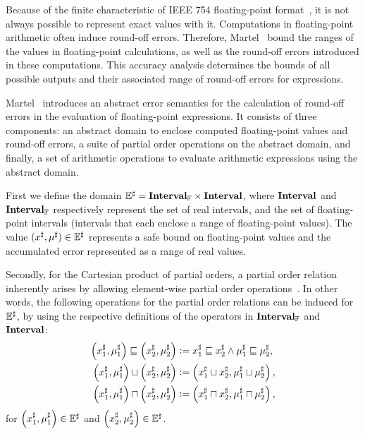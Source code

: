 Because of the finite characteristic of IEEE 754 floating-point
format~\cite{ieee754}, it is not always possible to represent exact values
with it.  Computations in floating-point arithmetic often induce round-off
errors.  Therefore, Martel~\cite{martel07} bound the ranges of the values
in floating-point calculations, as well as the round-off errors introduced
in these computations.  This accuracy analysis determines the bounds of
all possible outputs and their associated range of round-off errors for
expressions.

Martel~\cite{martel07} introduces an abstract error semantics for the
calculation of round-off errors in the evaluation of floating-point
expressions.  It consists of three components: an abstract domain to enclose
computed floating-point values and round-off errors, a suite of partial order
operations on the abstract domain, and finally, a set of arithmetic operations
to evaluate arithmetic expressions using the abstract domain.

First we define the domain $\mathbb{E}^\sharp = \mathbf{Interval}_\mathbb{F}\times\mathbf{Interval}$,
where $\mathbf{Interval}$ and $\mathbf{Interval}_\mathbb{F}$ respectively represent the
set of real intervals, and the set of floating-point intervals (intervals
that each enclose a range of floating-point values).  The value $(x^\sharp,
\mu^\sharp) \in \mathbb{E}^\sharp$ represents a safe bound on floating-point
values and the accumulated error represented as a range of real values.

Secondly, for the Cartesian product of partial orders, a partial order
relation inherently arises by allowing element-wise partial order
operations~\cite{abramsky94}.  In other words, the following operations for the
partial order relations can be induced for $\mathbb{E}^\sharp$, by using the respective
definitions of the operators in $\mathbf{Interval}_\mathbb{F}$ and $\mathbf{Interval}$:
\begin{equation}
    \begin{aligned}
        \left( x^\sharp_1, \mu^\sharp_1 \right) \sqsubseteq
        \left( x^\sharp_2, \mu^\sharp_2 \right)
        &\vcentcolon=
            x^\sharp_1 \sqsubseteq x^\sharp_2 \wedge
            \mu^\sharp_1 \sqsubseteq \mu^\sharp_2, \\
        \left( x^\sharp_1, \mu^\sharp_1 \right) \sqcup
        \left( x^\sharp_2, \mu^\sharp_2 \right)
        &\vcentcolon=
            \left( x^\sharp_1 \sqcup x^\sharp_2,
              \mu^\sharp_1 \sqcup \mu^\sharp_2 \right), \\
        \left( x^\sharp_1, \mu^\sharp_1 \right) \sqcap
        \left( x^\sharp_2, \mu^\sharp_2 \right)
        &\vcentcolon=
            \left( x^\sharp_1 \sqcap x^\sharp_2,
              \mu^\sharp_1 \sqcap \mu^\sharp_2 \right),
    \end{aligned}
\end{equation}
for $\left( x^\sharp_1, \mu^\sharp_1 \right) \in \mathbb{E}^\sharp$ and
$\left( x^\sharp_2, \mu^\sharp_2 \right) \in \mathbb{E}^\sharp$.

